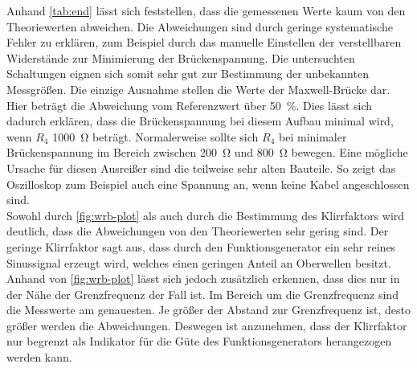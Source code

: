 \noindent Anhand \autoref{tab:end} lässt sich feststellen, dass die gemessenen Werte kaum von den Theoriewerten abweichen.
Die Abweichungen sind durch geringe systematische Fehler zu erklären, zum Beispiel durch das manuelle Einstellen der verstellbaren Widerstände
zur Minimierung der Brückenspannung.
Die untersuchten Schaltungen eignen sich somit sehr gut zur Bestimmung der unbekannten Messgrößen.
Die einzige Ausnahme stellen die Werte der Maxwell-Brücke dar.  Hier beträgt die Abweichung vom Referenzwert über \qty{50}{\percent}.
Dies lässt sich dadurch erklären, dass die Brückenspannung bei diesem Aufbau minimal wird, wenn $R_4$ \qty{1000}{\ohm} beträgt.
Normalerweise sollte sich $R_4$ bei minimaler Brückenspannung im Bereich zwischen \qty{200}{\ohm} und \qty{800}{\ohm} bewegen. Eine mögliche Ursache für diesen
Ausreißer sind die teilweise sehr alten Bauteile. So zeigt das Oszilloskop zum Beispiel auch eine Spannung an, wenn keine Kabel angeschlossen sind.\\

\noindent Sowohl durch \autoref{fig:wrb-plot} als auch durch die Bestimmung des Klirrfaktors wird deutlich, dass die Abweichungen von den Theoriewerten sehr gering sind.
Der geringe Klirrfaktor sagt aus, dass durch den Funktionsgenerator ein sehr reines Sinussignal erzeugt wird, welches einen geringen Anteil an Oberwellen besitzt. 
Anhand von \autoref{fig:wrb-plot} lässt sich jedoch zusätzlich erkennen, dass dies nur in der Nähe der Grenzfrequenz der Fall ist.
Im Bereich um die Grenzfrequenz sind die Messwerte am genauesten. Je größer der Abstand zur Grenzfrequenz ist, desto größer werden die Abweichungen.
Deswegen ist anzunehmen, dass der Klirrfaktor nur begrenzt als Indikator für die Güte des Funktionsgenerators herangezogen werden kann.






